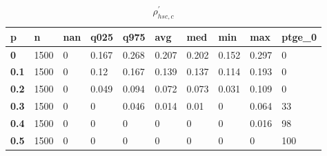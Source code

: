 \begin{table}[h]
 \centering 
\footnotesize
\caption{$\rho_{hsc,c}^\prime $}
\label{tab:alphahscc}
\begin{tabular}[h]{|l|l|l|l|l|l|l|l|l|l|
    } \hline
\textbf{ p} & \textbf{ n} & \textbf{ nan} & \textbf{ q025} & \textbf{ q975} & \textbf{ avg} & \textbf{ med} & \textbf{ min} & \textbf{ max} & \textbf{ ptge\_0}
    \\ \hline
  \textbf{  0} & 1500 & 0 & 0.167 & 0.268 & 0.207 & 0.202 & 0.152 & 0.297 &   0
    \\ \hline
  \textbf{0.1} & 1500 & 0 &  0.12 & 0.167 & 0.139 & 0.137 & 0.114 & 0.193 &   0
    \\ \hline
  \textbf{0.2} & 1500 & 0 & 0.049 & 0.094 & 0.072 & 0.073 & 0.031 & 0.109 &   0
    \\ \hline
  \textbf{0.3} & 1500 & 0 &     0 & 0.046 & 0.014 &  0.01 &     0 & 0.064 &  33
    \\ \hline
  \textbf{0.4} & 1500 & 0 &     0 &     0 &     0 &     0 &     0 & 0.016 &  98
    \\ \hline
  \textbf{0.5} & 1500 & 0 &     0 &     0 &     0 &     0 &     0 &     0 & 100
    \\ \hline
 \end{tabular}
 \end{table}
